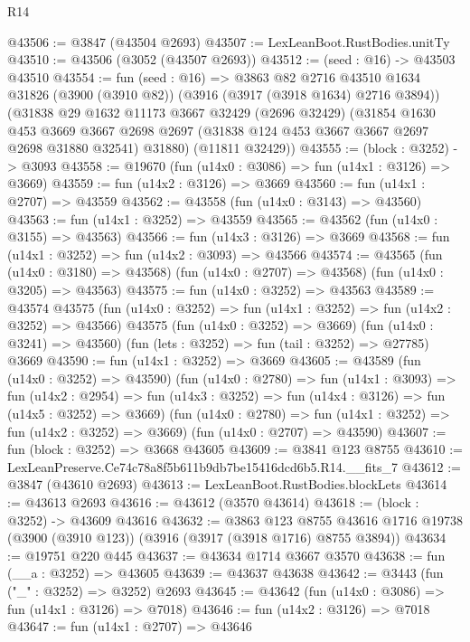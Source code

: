 \begin{lexlean}{R14}
\begin{coremodule}
@43506 := @3847 (@43504 @2693)
@43507 := LexLeanBoot.RustBodies.unitTy
@43510 := @43506 (@3052 (@43507 @2693))
@43512 := (seed : @16) -> @43503 @43510
@43554 := fun (seed : @16) =>
  @3863
    @82
    @2716
    @43510
    @1634
    @31826
    (@3900 (@3910 @82))
    (@3916 (@3917 (@3918 @1634) @2716 @3894))
    (@31838
      @29
      @1632
      @11173
      @3667
      @32429
      (@2696 @32429)
      (@31854
        @1630
        @453
        @3669
        @3667
        @2698
        @2697
        (@31838 @124 @453 @3667 @3667 @2697 @2698 @31880 @32541)
        @31880)
      (@11811 @32429))
@43555 := (block : @3252) -> @3093
@43558 := @19670 (fun (u14x0 : @3086) => fun (u14x1 : @3126) => @3669)
@43559 := fun (u14x2 : @3126) => @3669
@43560 := fun (u14x1 : @2707) => @43559
@43562 := @43558 (fun (u14x0 : @3143) => @43560)
@43563 := fun (u14x1 : @3252) => @43559
@43565 := @43562 (fun (u14x0 : @3155) => @43563)
@43566 := fun (u14x3 : @3126) => @3669
@43568 := fun (u14x1 : @3252) => fun (u14x2 : @3093) => @43566
@43574 := @43565
    (fun (u14x0 : @3180) => @43568)
    (fun (u14x0 : @2707) => @43568)
    (fun (u14x0 : @3205) => @43563)
@43575 := fun (u14x0 : @3252) => @43563
@43589 := @43574
    @43575
    (fun (u14x0 : @3252) => fun (u14x1 : @3252) => fun (u14x2 : @3252) => @43566)
    @43575
    (fun (u14x0 : @3252) => @3669)
    (fun (u14x0 : @3241) => @43560)
    (fun (lets : @3252) => fun (tail : @3252) => @27785)
    @3669
@43590 := fun (u14x1 : @3252) => @3669
@43605 := @43589
    (fun (u14x0 : @3252) => @43590)
    (fun (u14x0 : @2780) =>
    fun (u14x1 : @3093) =>
    fun (u14x2 : @2954) =>
    fun (u14x3 : @3252) => fun (u14x4 : @3126) => fun (u14x5 : @3252) => @3669)
    (fun (u14x0 : @2780) => fun (u14x1 : @3252) => fun (u14x2 : @3252) => @3669)
    (fun (u14x0 : @2707) => @43590)
@43607 := fun (block : @3252) => @3668 @43605
@43609 := @3841 @123 @8755
@43610 := LexLeanPreserve.Ce74c78a8f5b611b9db7be15416dcd6b5.R14.__fits_7
@43612 := @3847 (@43610 @2693)
@43613 := LexLeanBoot.RustBodies.blockLets
@43614 := @43613 @2693
@43616 := @43612 (@3570 @43614)
@43618 := (block : @3252) -> @43609 @43616
@43632 := @3863
    @123
    @8755
    @43616
    @1716
    @19738
    (@3900 (@3910 @123))
    (@3916 (@3917 (@3918 @1716) @8755 @3894))
@43634 := @19751 @220 @445
@43637 := @43634 @1714 @3667 @3570
@43638 := fun (__a : @3252) => @43605
@43639 := @43637 @43638
@43642 := @3443 (fun ("_" : @3252) => @3252) @2693
@43645 := @43642 (fun (u14x0 : @3086) => fun (u14x1 : @3126) => @7018)
@43646 := fun (u14x2 : @3126) => @7018
@43647 := fun (u14x1 : @2707) => @43646

\end{coremodule}
\end{lexlean}
